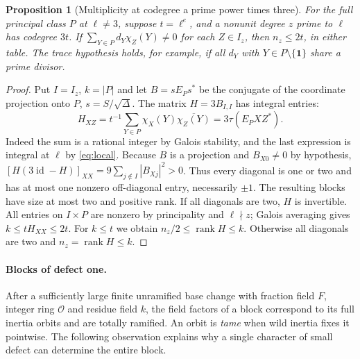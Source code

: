 \documentclass[11pt,a4paper]{article}
\numberwithin{equation}{section}
\newtheorem{proposition}[theorem]{Proposition}
\theoremstyle{remark}
\newcommand{\one}{\mathbf1}
\begin{document}
\begin{proposition}[Multiplicity at codegree a prime power times three]\label{fam:M:2.8}\label{new:principal-gram}
For the full principal class $P$ at $\ell\ne3$, suppose $t=\ell^e$, and a nonunit degree $z$ prime to $\ell$ has
codegree $3t$. If $\sum_{Y\in P}d_Y\chi_Z(Y)\ne0$ for each $Z\in I_z$,
then $n_z\le2t$, in either table. The trace hypothesis holds, for
example, if all $d_Y$ with $Y\in P\setminus\{\one\}$ share a prime divisor.
\end{proposition}
\begin{proof}
Put $I=I_z$, $k=|P|$ and let $B=sE_Ps^*$ be the conjugate
of the coordinate projection onto $P$, $s=S/\sqrt\Delta$.
The matrix $H=3B_{I,I}$ has integral entries:
\[
 H_{XZ}=t^{-1}\sum_{Y\in P}\chi_X(Y)\overline{\chi_Z(Y)}
       =3\tau(E_PXZ^*).
\]
Indeed the sum is a rational integer by Galois stability, and the
last expression is integral at $\ell$ by \eqref{eq:local}.
Because $B$ is a projection and $B_{X0}\ne0$ by hypothesis,
$[H(3\operatorname{id}-H)]_{XX}=9\sum_{j\notin I}|B_{Xj}|^2>0$. Thus every
diagonal is one or two and has at most one nonzero off-diagonal
entry, necessarily $\pm1$. The resulting blocks have size at most
two and positive rank. If all diagonals are two, $H$ is invertible.
All entries on $I\times P$ are nonzero by principality and
$\ell\nmid z$; Galois averaging gives $k\le tH_{XX}\le2t$.
For $k\le t$ we obtain $n_z/2\le\operatorname{rank}H\le k$.
Otherwise all diagonals are two and $n_z=\operatorname{rank}H\le k$.

\end{proof}

\paragraph{Blocks of defect one.}
After a sufficiently large finite unramified base change with fraction
field $F$, integer ring $\mathcal O$ and residue field $k$, the field factors of a block
correspond to its full inertia orbits and are totally ramified.
An orbit is \emph{tame} when wild inertia fixes it pointwise.
The following observation explains why a single character of small
defect can determine the entire block.
\end{document}
